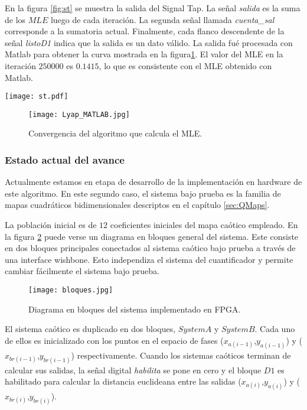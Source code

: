 En la figura \ref{fig:st} se muestra la salida del Signal Tap.
La señal \textit{salida} es la suma de los $MLE$ luego de cada iteración.
La segunda señal llamada \textit{cuenta\_sal} corresponde a la sumatoria actual.
Finalmente, cada flanco descendente de la señal \textit{listoD1} indica que la salida es un dato válido.
La salida fué procesada con Matlab para obtener la curva mostrada en la figura\ref{fig:lyapu}.
El valor del MLE en la iteración $250000$ es $0.1415$, lo que es consistente con el MLE obtenido con Matlab.
%
\begin{figure*}
	\centering
	\texttt{[image: st.pdf]}\\
	\caption{Salida del Signal Tap.}\label{fig:st}
\end{figure*}
%
\begin{figure}
	\centering
	\texttt{[image: Lyap\_MATLAB.jpg]}\\
	\caption{Convergencia del algoritmo que calcula el MLE.}\label{fig:lyapu}
\end{figure}


\subsubsection{Estado actual del avance}

Actualmente estamos en etapa de desarrollo de la implementación en hardware de este algoritmo.
En este segundo caso, el sistema bajo prueba es la familia de mapas cuadráticos bidimensionales descriptos en el capítulo \ref{sec:QMaps}.

La población inicial es de $12$ coeficientes iniciales del mapa caótico empleado.
En la figura \ref{bloques} puede verse un diagrama en bloques general del sistema.
Este consiste en dos bloques principales conectados al sistema caótico bajo prueba a través de una interface wishbone.
Esto independiza el sistema del cuantificador y permite cambiar fácilmente el sistema bajo prueba.
%
\begin{figure}
	\centering
	\texttt{[image: bloques.jpg]}\\
	\caption{Diagrama en bloques del sistema implementado en FPGA.}\label{bloques}
\end{figure}

El sistema caótico es duplicado en dos bloques, $System A$ y $System B$.
Cada uno de ellos es inicializado con los puntos en el espacio de fases	($x_{a(i-1)}$,$y_{a(i-1)}$) y ($x_{br(i-1)}$,$y_{br(i-1)}$) respectivamente.
Cuando los sistemas caóticos terminan de calcular sus salidas, la señal digital \textit{habilita} se pone en cero y el bloque $D1$ es habilitado para calcular la distancia euclideana entre las salidas ($x_{a(i)}$,$y_{a(i)}$) y ($x_{br(i)}$,$y_{br(i)}$).

